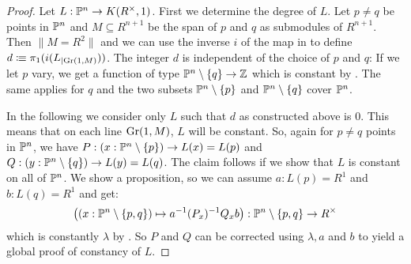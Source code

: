 \begin{proof}
  Let $L:\mathbb{P}^n\to K(R^{\times},1)$. First we determine the degree of $L$.
  Let $p\neq q$ be points in $\mathbb{P}^n$ and $M\subseteq R^{n+1}$ be the span of $p$ and $q$ as submodules of $R^{n+1}$.
  Then $\|M=R^2\|$ and we can use the inverse $i$ of the map in  to define $d\vcentcolon\mspace{-1.2mu}\equiv \pi_1(i(L_{|\mathrm{Gr}(1,M)}))$.
  The integer $d$ is independent of the choice of $p$ and $q$:
  If we let $p$ vary, we get a function of type $\mathbb{P}^n\setminus\{q\}\to \mathbb{Z}$ which is constant by .
  The same applies for $q$
  and the two subsets $\mathbb{P}^n\setminus\{p\}$ and $\mathbb{P}^n\setminus\{q\}$ cover $\mathbb{P}^n$.

  In the following we consider only $L$ such that $d$ as constructed above is $0$.
  This means that on each line $\mathrm{Gr}(1,M)$, $L$ will be constant.
  So, again for $p\neq q$ points in $\mathbb{P}^n$,
  we have $P:(x:\mathbb{P}^n\setminus\{p\})\to L(x)=L(p)$ and $Q:(y:\mathbb{P}^n\setminus\{q\})\to L(y)=L(q)$.
  The claim follows if we show that $L$ is constant on all of $\mathbb{P}^n$.
  We show a proposition, so we can assume $a:L(p)=R^1$ and $b:L(q)=R^1$ and get:
  \[ \left((x:\mathbb{P}^n\setminus\{p,q\})\mapsto a^{-1}(P_x)^{-1}Q_xb\right) : \mathbb{P}^n\setminus\{p,q\} \to R^\times\]
  which is constantly $\lambda$ by .
  So $P$ and $Q$ can be corrected using $\lambda,a$ and $b$ to yield a global proof of constancy of $L$.
\end{proof}
